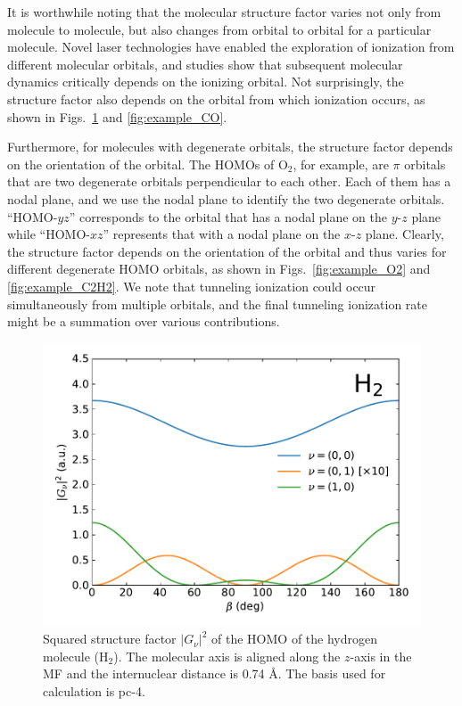 \documentclass[preprint,12pt]{elsarticle} %
\renewcommand{\rm}[1]{\mathrm{#1}}    %
\newcommand{\abs}[1]{\lvert #1 \rvert}  %
\begin{document}
It is worthwhile noting that the molecular structure factor varies not only from molecule to molecule, but also changes from orbital to orbital for a particular molecule. Novel laser technologies have enabled the exploration of ionization from different molecular orbitals, and studies show that subsequent molecular dynamics critically depends on the ionizing orbital. Not surprisingly, the structure factor also depends on the orbital from which ionization occurs, as shown in Figs.~\ref{fig:example_H2} and \ref{fig:example_CO}.

Furthermore, for molecules with degenerate orbitals, the structure factor depends on the orientation of the orbital. The HOMOs of $\rm{O}_2$, for example, are $\pi$ orbitals that are two degenerate orbitals perpendicular to each other. Each of them has a nodal plane, and we use the nodal plane to identify the two degenerate orbitals. ``HOMO-$yz$'' corresponds to the orbital that has a nodal plane on the $y$-$z$ plane while ``HOMO-$xz$'' represents that with a nodal plane on the $x$-$z$ plane. Clearly, the structure factor depends on the orientation of the orbital and thus varies for different degenerate HOMO orbitals, as shown in Figs.~\ref{fig:example_O2} and \ref{fig:example_C2H2}. We note that tunneling ionization could occur simultaneously from multiple orbitals, and the final tunneling ionization rate might be a summation over various contributions.

\begin{figure}
    \centering
    \includegraphics[width=\columnwidth]{H2_Example_sub_20230225.pdf}
    \caption{Squared structure factor $\abs{G_\nu}^2$ of the HOMO of the hydrogen molecule ($\rm{H}_2$). The molecular axis is aligned along the $z$-axis in the MF and the internuclear distance is 0.74 \r{A}. The basis used for calculation is pc-4.}
    \label{fig:example_H2}
\end{figure}
\end{document}
